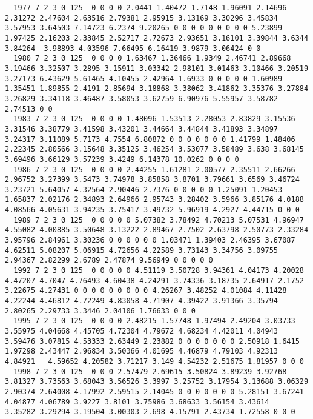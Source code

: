 \begin{landscape}
{\begin{verbatim}
  1977 7 2 3 0 125  0 0 0 0 2.0441 1.40472 1.7148 1.96091 2.14696 2.31272 2.47604 2.63516 2.79381 2.95915 3.13169 3.30296 3.45834 3.57953 3.64503 7.14723 6.2374 9.20265 0 0 0 0 0 0 0 0 0 5.23899 1.97425 2.16203 2.33845 2.52717 2.72673 2.93651 3.16101 3.39844 3.6344 3.84264  3.98893 4.03596 7.66495 6.16419 3.9879 3.06424 0 0
  1980 7 2 3 0 125  0 0 0 0 1.63467 1.36466 1.9349 2.46741 2.89668 3.19466 3.32507 3.2895 3.15911 3.03342 2.98101 3.01463 3.10466 3.20519 3.27173 6.43629 5.61465 4.10455 2.42964 1.6933 0 0 0 0 0 1.60989 1.35451 1.89855 2.4191 2.85694 3.18868 3.38062 3.41862 3.35376 3.27884  3.26829 3.34118 3.46487 3.58053 3.62759 6.90976 5.55957 3.58782 2.74513 0 0
  1983 7 2 3 0 125  0 0 0 0 1.48096 1.53513 2.28053 2.83829 3.15536 3.31546 3.38779 3.41598 3.43201 3.44664 3.44844 3.41893 3.34897 3.24317 3.11089 5.7173 4.7554 6.80872 0 0 0 0 0 0 0 1.41799 1.48406 2.22345 2.80566 3.15648 3.35125 3.46254 3.53077 3.58489 3.638 3.68145  3.69496 3.66129 3.57239 3.4249 6.14378 10.0262 0 0 0 0
  1986 7 2 3 0 125  0 0 0 0 2.44255 1.61281 2.00577 2.35511 2.66266 2.96752 3.27399 3.5473 3.74978 3.85858 3.8701 3.79661 3.6569 3.46724 3.23721 5.64057 4.32564 2.90446 2.7376 0 0 0 0 0 1.25091 1.20453 1.65837 2.02176 2.34893 2.64966 2.95743 3.28402 3.5966 3.85176 4.0188  4.08566 4.05631 3.94235 3.75417 3.49732 5.96919 4.2927 4.44715 0 0 0
  1989 7 2 3 0 125  0 0 0 0 0 5.07382 3.78492 4.70213 5.07531 4.96947 4.55082 4.00885 3.50648 3.13222 2.89467 2.7502 2.63798 2.50773 2.33284 3.95796 2.84961 3.30236 0 0 0 0 0 0 1.03471 1.39403 2.46395 3.67087 4.62511 5.08207 5.06915 4.72656 4.22589 3.73143 3.34756 3.09755   2.94367 2.82299 2.6789 2.47874 9.56949 0 0 0 0 0
  1992 7 2 3 0 125  0 0 0 0 0 4.51119 3.50728 3.94361 4.04173 4.20028 4.47207 4.7047 4.76493 4.60438 4.24291 3.74336 3.18735 2.64917 2.1752 3.22675 4.27431 0 0 0 0 0 0 0 0 0 4.26267 3.48252 4.01084 4.11428 4.22244 4.46812 4.72249 4.83058 4.71907 4.39422 3.91366 3.35794  2.80265 2.29733 3.3446 2.04106 1.76633 0 0 0
  1995 7 2 3 0 125  0 0 0 0 2.48215 1.57748 1.97494 2.49204 3.03733 3.55975 4.04668 4.45705 4.72304 4.79672 4.68234 4.42011 4.04943 3.59476 3.07815 4.53333 2.63449 2.23882 0 0 0 0 0 0 0 2.50918 1.6415 1.97298 2.43447 2.96834 3.50366 4.01695 4.46879 4.79103 4.92313 4.84921   4.59652 4.20582 3.71217 3.149 4.54232 2.51675 1.81957 0 0 0
  1998 7 2 3 0 125  0 0 0 2.57479 2.69615 3.50824 3.89239 3.92768 3.81327 3.73563 3.68043 3.56526 3.3997 3.25752 3.17954 3.13688 3.06329 2.90374 2.64008 4.17992 2.59515 2.14045 0 0 0 0 0 0 0 5.28151 3.67241 4.04877 4.06789 3.9227 3.8101 3.75986 3.68633 3.56154 3.43614   3.35282 3.29294 3.19504 3.00303 2.698 4.15791 2.43734 1.72558 0 0 0

\end{verbatim}}
\end{landscape}
